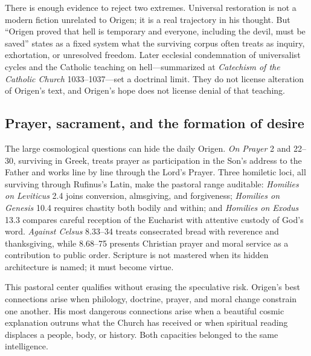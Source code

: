 There is enough evidence to reject two extremes. Universal restoration is not
a modern fiction unrelated to Origen; it is a real trajectory in his thought.
But ``Origen proved that hell is temporary and everyone, including the devil,
must be saved'' states as a fixed system what the surviving corpus often treats
as inquiry, exhortation, or unresolved freedom. Later ecclesial condemnation
of universalist cycles and the Catholic teaching on hell---summarized at
\emph{Catechism of the Catholic Church} 1033--1037---set a doctrinal limit.
They do not license alteration of Origen's text, and Origen's hope does not
license denial of that teaching.

\subsection{Prayer, sacrament, and the formation of desire}

The large cosmological questions can hide the daily Origen. \emph{On Prayer}
2 and 22--30, surviving in Greek, treats prayer as participation in the Son's
address to the Father and works line by line through the Lord's Prayer. Three
homiletic loci, all surviving through Rufinus's Latin, make the pastoral range
auditable: \emph{Homilies on Leviticus} 2.4 joins conversion, almsgiving, and
forgiveness; \emph{Homilies on Genesis} 10.4 requires chastity both bodily and
within; and \emph{Homilies on Exodus} 13.3 compares careful reception of the
Eucharist with attentive custody of God's word. \emph{Against Celsus}
8.33--34 treats consecrated bread with
reverence and thanksgiving, while 8.68--75 presents Christian prayer and moral
service as a contribution to public order. Scripture is not mastered when its
hidden architecture is named; it must become virtue.

This pastoral center qualifies without erasing the speculative risk. Origen's
best connections arise when philology, doctrine, prayer, and moral change
constrain one another. His most dangerous connections arise when a beautiful
cosmic explanation outruns what the Church has received or when spiritual
reading displaces a people, body, or history. Both capacities belonged to the
same intelligence.
